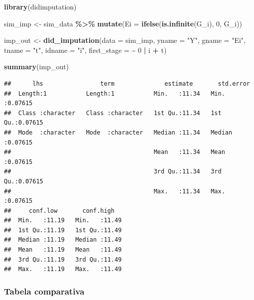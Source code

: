 \documentclass[
]{article}
\newenvironment{Shaded}{\begin{snugshade}}{\end{snugshade}}
\newcommand{\AttributeTok}[1]{\textcolor[rgb]{0.13,0.29,0.53}{#1}}
\newcommand{\DecValTok}[1]{\textcolor[rgb]{0.00,0.00,0.81}{#1}}
\newcommand{\FunctionTok}[1]{\textcolor[rgb]{0.13,0.29,0.53}{\textbf{#1}}}
\newcommand{\NormalTok}[1]{#1}
\newcommand{\OtherTok}[1]{\textcolor[rgb]{0.56,0.35,0.01}{#1}}
\newcommand{\SpecialCharTok}[1]{\textcolor[rgb]{0.81,0.36,0.00}{\textbf{#1}}}
\newcommand{\StringTok}[1]{\textcolor[rgb]{0.31,0.60,0.02}{#1}}
\begin{document}
\begin{Shaded}
\begin{Highlighting}[]
\FunctionTok{library}\NormalTok{(didimputation)}

\NormalTok{sim\_imp }\OtherTok{\textless{}{-}}\NormalTok{ sim\_data }\SpecialCharTok{\%\textgreater{}\%}
  \FunctionTok{mutate}\NormalTok{(}\AttributeTok{Ei =} \FunctionTok{ifelse}\NormalTok{(}\FunctionTok{is.infinite}\NormalTok{(G\_i), }\DecValTok{0}\NormalTok{, G\_i))}

\NormalTok{imp\_out }\OtherTok{\textless{}{-}} \FunctionTok{did\_imputation}\NormalTok{(}\AttributeTok{data =}\NormalTok{ sim\_imp,}
                          \AttributeTok{yname =} \StringTok{"Y"}\NormalTok{,}
                          \AttributeTok{gname =} \StringTok{"Ei"}\NormalTok{,}
                          \AttributeTok{tname =} \StringTok{"t"}\NormalTok{,}
                          \AttributeTok{idname =} \StringTok{"i"}\NormalTok{,}
                          \AttributeTok{first\_stage =} \SpecialCharTok{\textasciitilde{}} \DecValTok{0} \SpecialCharTok{|}\NormalTok{ i }\SpecialCharTok{+}\NormalTok{ t)}

\FunctionTok{summary}\NormalTok{(imp\_out)}
\end{Highlighting}
\end{Shaded}

\begin{verbatim}
##      lhs                term              estimate       std.error      
##  Length:1           Length:1           Min.   :11.34   Min.   :0.07615  
##  Class :character   Class :character   1st Qu.:11.34   1st Qu.:0.07615  
##  Mode  :character   Mode  :character   Median :11.34   Median :0.07615  
##                                        Mean   :11.34   Mean   :0.07615  
##                                        3rd Qu.:11.34   3rd Qu.:0.07615  
##                                        Max.   :11.34   Max.   :0.07615  
##     conf.low       conf.high    
##  Min.   :11.19   Min.   :11.49  
##  1st Qu.:11.19   1st Qu.:11.49  
##  Median :11.19   Median :11.49  
##  Mean   :11.19   Mean   :11.49  
##  3rd Qu.:11.19   3rd Qu.:11.49  
##  Max.   :11.19   Max.   :11.49
\end{verbatim}

\subsubsection{Tabela comparativa}\label{tabela-comparativa}
\end{document}
